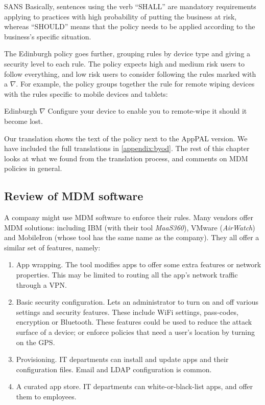 \documentclass[thesis.tex]{subfiles}
\begin{document}
\begin{policyrule}{SANS}
  Basically, sentences using the verb ``SHALL'' are mandatory requirements
  applying to practices with high probability of putting the business at risk,
  whereas ``SHOULD'' means that the policy needs to be applied according to the
  business's specific situation.
\end{policyrule}

The Edinburgh policy goes further, grouping rules by device type and
giving a security level to each rule.  The policy expects high and
medium risk users to follow everything, and low risk users to consider
following the rules marked with a $\nabla$.  For example, the policy
groups together the rule for remote wiping devices with the rules
specific to mobile devices and tablets:

\begin{policyrule}{Edinburgh}
  $\nabla$ Configure your device to enable you to remote-wipe it should it become lost.
\end{policyrule}

Our translation shows the text of the policy next to the AppPAL version.  We have included the full translations in
\autoref{appendix:byod}. The rest of this chapter looks at what we
found from the translation process, and comments on \ac{MDM} policies in
general.

\subsection{Review of MDM software}

A company might use \ac{MDM} software to enforce their rules.  Many
vendors offer \ac{MDM} solutions: including IBM (with their tool
\emph{MaaS360}), VMware (\emph{AirWatch}) and MobileIron (whose tool
has the same name as the company). They all offer a similar set of
features, namely:
\begin{enumerate}
\item App wrapping. The tool modifies apps to offer some extra
  features or network properties. This may be limited to routing all
  the app's network traffic through a VPN.
\item Basic security configuration. Lets an administrator to turn on
  and off various settings and security features. These
  include WiFi settings, pass-codes, encryption or Bluetooth.  These
  features could be used to reduce the attack surface of a device; or enforce policies that need a user's location
  by turning on the GPS.
\item Provisioning. IT departments can install and update apps and
  their configuration files. Email and LDAP configuration is common.
\item A curated app store. IT departments can white-or-black-list apps, and offer them to employees.
\end{enumerate}
\end{document}
